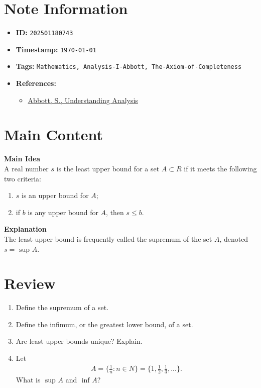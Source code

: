 \clearpage
{}
\label{202501180743}
\renewcommand{\notetitle}{Supremum and Infimum}

\section*{Note Information}
\begin{itemize}
  \item \textbf{ID:} \texttt{202501180743}
  \item \textbf{Timestamp:} \texttt{\today \ \currenttime}
  \item \textbf{Tags:} \texttt{Mathematics, Analysis-I-Abbott, The-Axiom-of-Completeness}
  \item \textbf{References:}
    \begin{itemize}
      \item \href{/home/garrett/Personal/References/Mathematics/Analysis-I/Abbott.pdf}{Abbott, S., Understanding Analysis}
    \end{itemize}
\end{itemize}


\section*{Main Content}
\textbf{Main Idea}\\
A real number $s$ is the least upper bound for a set $A \subset R$ if it meets the following two criteria:
\begin{enumerate}
  \item $s$ is an upper bound for $A$;
  \item if $b$ is any upper bound for $A$, then $s \leq b$.\\
\end{enumerate}

\textbf{Explanation}\\
The least upper bound is frequently called the supremum of the set $A$, denoted $s = \text{ sup } A$.


\section*{Review}
\begin{enumerate}
  \item Define the supremum of a set.
  \item Define the infimum, or the greatest lower bound, of a set.
  \item Are least upper bounds unique? Explain.
  \item Let
  \begin{align*}
    A = \{ \frac{1}{n}: n \in N \} = \{1, \frac{1}{2}, \frac{1}{3}, ... \}.
  \end{align*}
  What is $\text{ sup } A$ and $\text{ inf } A$?
\end{enumerate}



